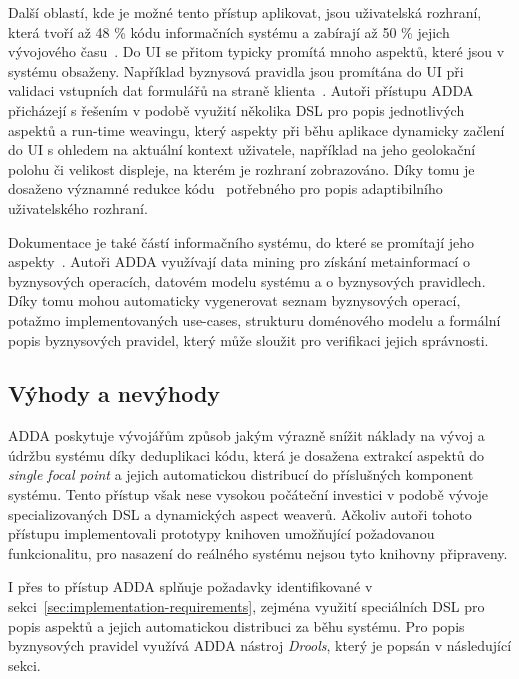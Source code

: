 Další oblastí, kde je možné tento přístup aplikovat, jsou uživatelská rozhraní,
která tvoří až 48 \% kódu informačních systému a zabírají až 50 \%
jejich vývojového času~\cite{kennard2009separation}.
Do \gls{UI} se přitom typicky promítá mnoho aspektů, které jsou
v systému obsaženy. Například byznysová pravidla jsou promítána do \gls{UI}
při validaci vstupních dat formulářů na straně klienta~\cite{cemus2017separation}.
Autoři přístupu \gls{ADDA} přicházejí s řešením v podobě
využití několika \gls{DSL} pro popis jednotlivých aspektů
a run-time weavingu, který aspekty při běhu aplikace
dynamicky začlení do \gls{UI} s ohledem na aktuální kontext
uživatele, například na jeho geolokační polohu či velikost
displeje, na kterém je rozhraní zobrazováno.
Díky tomu je dosaženo významné redukce kódu~\cite{cemus2016context}
potřebného pro popis adaptibilního uživatelského rozhraní.

Dokumentace je také částí informačního systému, do které se promítají
jeho aspekty~\cite{cemus2017automated}. Autoři \gls{ADDA}
využívají data mining pro získání metainformací o byznysových operacích,
datovém modelu systému a o byznysových pravidlech. Díky tomu mohou
automaticky vygenerovat seznam byznysových operací, potažmo implementovaných
use-cases, strukturu doménového modelu a formální popis byznysových pravidel,
který může sloužit pro verifikaci jejich správnosti.

\subsection{Výhody a nevýhody}

\gls{ADDA} poskytuje vývojářům způsob jakým výrazně snížit náklady na vývoj a údržbu
systému díky deduplikaci kódu, která je dosažena extrakcí aspektů
do \textit{single focal point} a jejich automatickou distribucí do
příslušných komponent systému. Tento přístup však nese vysokou počáteční investici v
podobě vývoje specializovaných \gls{DSL} a dynamických aspect weaverů.
Ačkoliv autoři tohoto přístupu implementovali prototypy knihoven umožňující
požadovanou funkcionalitu, pro nasazení do reálného systému
nejsou tyto knihovny připraveny.

I přes to přístup \gls{ADDA} splňuje požadavky identifikované v sekci~\ref{sec:implementation-requirements},
zejména využití speciálních \gls{DSL} pro popis aspektů a jejich automatickou distribuci za běhu systému.
Pro popis byznysových pravidel využívá \gls{ADDA} nástroj \textit{Drools}, který je popsán v následující sekci.

